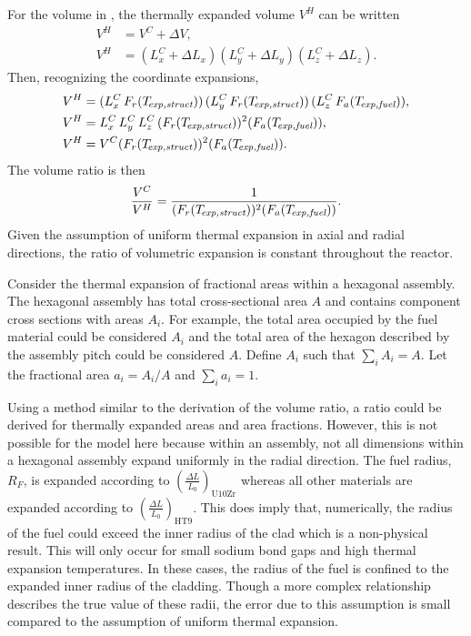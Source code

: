    For the volume in , the thermally expanded 
    volume $V^H$ can be written
    \begin{align}
      V^H &= V^C + \Delta V, \\
      V^H &= (L_x^C + \Delta L_x) (L_y^C + \Delta L_y) (L_z^C + \Delta L_z). 
    \end{align}
    Then, recognizing the coordinate expansions,
    \begin{align}
      V^H &= (L_x^C \, F_r(T_{\!\mbox{\scriptsize \em exp,struct}})) \,
        (L_y^C \, F_r(T_{\!\mbox{\scriptsize \em exp,struct}})) \,
        (L_z^C \, F_a({T_{\!\mbox{\scriptsize \em exp,fuel}}})), \\
      V^H &= L_x^C \, L_y^C \, L_z^C \, (F_r(T_{\!\mbox{\scriptsize \em exp,struct}}))^2
        (F_a({T_{\!\mbox{\scriptsize \em exp,fuel}}})), \\
      V^H &= V^C (F_r(T_{\!\mbox{\scriptsize \em exp,struct}}))^2 (F_a({T_{\!\mbox{\scriptsize \em exp,fuel}}})).
    \end{align}
    The volume ratio is then
    \begin{equation}
      \label{eq:volume_ratio}
      \frac{V^C}{V^H} = \frac{1}{(F_r(T_{\!\mbox{\scriptsize \em exp,struct}}))^2 (F_a({T_{\!\mbox{\scriptsize \em exp,fuel}}}))}.
    \end{equation}
    Given the assumption of uniform thermal expansion in axial and radial
    directions, the ratio of volumetric expansion is constant throughout the
    reactor.

    Consider the thermal expansion of fractional areas within a hexagonal
    assembly. The hexagonal assembly has total cross-sectional area $A$ and
    contains component cross sections with areas $A_i$. For example, the total
    area occupied by the fuel material could be considered $A_i$ and the total
    area of the hexagon described by the assembly pitch could be considered $A$.
    Define $A_i$ such that $\sum_{i} A_i = A$. Let the fractional area $a_i =
    A_i/A$ and $\sum_{i} a_i = 1$.

    Using a method similar to the derivation of the volume ratio, a ratio could
    be derived for thermally expanded areas and area fractions. However, this is
    not possible for the model here because within an assembly, not all
    dimensions within a hexagonal assembly expand uniformly in the radial
    direction. The fuel radius, $R_F$, is expanded according to
    $\left(\frac{\Delta L}{L_0}\right)_{\text{U10Zr}}$ whereas all other
    materials are expanded according to $\left(\frac{\Delta
    L}{L_0}\right)_{\text{HT9}}$. This does imply that, numerically, the radius
    of the fuel could exceed the inner radius of the clad which is a
    non-physical result. This will only occur for small sodium bond gaps and
    high thermal expansion temperatures. In these cases, the radius of the fuel
    is confined to the expanded inner radius of the cladding. Though a more
    complex relationship describes the true value of these radii, the error due
    to this assumption is small compared to the assumption of uniform thermal
    expansion.
    
